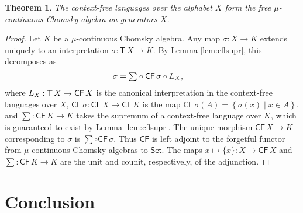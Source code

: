 \documentclass[copyright,creativecommons]{eptcs}
\newtheorem{theorem}{Theorem}[section]
\theoremstyle{remark}
\newcommand\fun{\mathrel\rightarrow}
\newcommand\set[2]{\left\{#1\mid #2\right\}}
\newcommand\mathname[1]{\ensuremath{\mathsf{#1}}}
\newcommand\Set{\mathname{Set}}
\newcommand\cset[1]{\{#1\}}
\newcommand\CFname{\mathname{CF}}
\newcommand\CF[1]{\CFname\,#1}
\newcommand\Tname{\mathname{T}}
\newcommand\T[1]{\Tname\,#1}
\begin{document}
\begin{theorem}
The context-free languages over the alphabet $X$ form the free $\mu$-continuous Chomsky algebra on generators $X$.
\end{theorem}
\begin{proof}
Let $K$ be a $\mu$-continuous Chomsky algebra.
Any map $\sigma:X\fun K$ extends uniquely to an interpretation $\sigma:\T X\fun K$. By Lemma \ref{lem:cflsupr}, this decomposes as
\begin{align*}
\sigma &= {\textstyle\sum}\circ\CF\sigma\circ\canon X,
\end{align*}
where $\canon X:\T X\fun\CF X$ is the canonical interpretation in the context-free languages over $X$, $\CF\sigma:\CF X\fun\CF K$ is the map $\CF\sigma(A) = \set{\sigma(x)}{x\in A}$, and ${\sum}:\CF K\fun K$ takes the supremum of a context-free language over $K$, which is guaranteed to exist by Lemma \ref{lem:cflsupr}. The unique morphism $\CF X\fun K$ corresponding to $\sigma$ is ${\sum}\circ\CF\sigma$. Thus $\CFname$ is left adjoint to the forgetful functor from $\mu$-continuous Chomsky algebras to \Set. The maps $x\mapsto\cset x:X\fun\CF X$ and ${\sum}:\CF K\fun K$ are the unit and counit, respectively, of the adjunction.
\end{proof}

\section{Conclusion}
\end{document}
